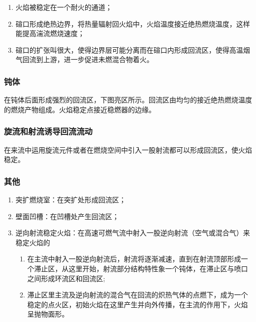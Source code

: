 \begin{enumerate}
    \item 火焰被稳定在一个耐火的通道；
    \item 碹口形成绝热边界，将热量辐射回火焰中，火焰温度接近绝热燃烧温度，这样能提高湍流燃烧速度；
    \item 碹口的扩张叫很大，使得边界层可能分离而在碹口内形成回流区，使得高温烟气回流到上游，进一步促进未燃混合物着火。
\end{enumerate}
\subsubsection{钝体}
在钝体后面形成强烈的回流区，下图亮区所示。回流区由均匀的接近绝热燃烧温度的燃烧产物组成。火焰稳定点接近稳燃器的边缘。
\subsubsection{旋流和射流诱导回流流动}
在来流中运用旋流元件或者在燃烧空间中引入一股射流都可以形成回流区，使火焰稳定。
\subsubsection{其他}
\begin{enumerate}
    \item 突扩燃烧室：在突扩处形成回流区；
    \item 壁面凹槽：在凹槽处产生回流区；
    \item 逆向射流稳定火焰：在高速可燃气流中射入一股逆向射流（空气或混合气）来稳定火焰的
    \begin{enumerate}
        \item 在主流中射入一股逆向射流后，射流将逐渐减速，直到在射流顶部形成一个滞止区，从这里开始，射流部分结构特性象一个钝体，在滞止区与喷口之间形成环流区和回流区;
        \item 滞止区里主流及逆向射流的混合气在回流的炽热气体的点燃下，成为一个稳定的点火区，初始火焰在这里产生并向外传播，在主流的作用下，火焰呈抛物面形。
    \end{enumerate}
\end{enumerate}
